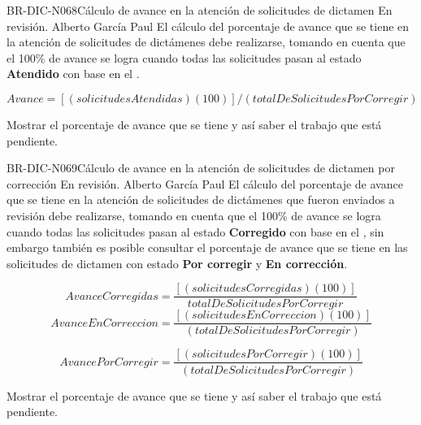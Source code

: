 \begin{BusinessRule}{BR-DIC-N068}{Cálculo de avance en la atención de solicitudes de dictamen}
	{\bcDerivation}    %
	{\btEnabler}     %
	{\blControlling}    %
	\BRItem[Estado] En revisión.
	 Alberto García Paul 
	\BRItem[Descripción] El cálculo del porcentaje de avance que se tiene en la atención de solicitudes de dictámenes debe realizarse, tomando en cuenta que el 100\% de avance se logra cuando todas las solicitudes pasan al estado \textbf{Atendido} con base en el .
	\BRItem[Sentencia]	\cdtEmpty
	
	$ Avance = [(solicitudesAtendidas)(100)]/(totalDeSolicitudesPorCorregir)$
	
	\BRItem[Motivacion] Mostrar el porcentaje de avance que se tiene y así saber el trabajo que está pendiente.
	
	
\end{BusinessRule}

\begin{BusinessRule}{BR-DIC-N069}{Cálculo de avance en la atención de solicitudes de dictamen por corrección}
	{\bcDerivation}    %
	{\btEnabler}     %
	{\blControlling}    %
	\BRItem[Estado] En revisión.
	 Alberto García Paul 
	\BRItem[Descripción] El cálculo del porcentaje de avance que se tiene en la atención de solicitudes de dictámenes que fueron enviados a revisión debe realizarse, tomando en cuenta que el 100\% de avance se logra cuando todas las solicitudes pasan al estado \textbf{Corregido} con base en el , sin embargo también es posible consultar el porcentaje de avance que se tiene en las solicitudes de dictamen con estado \textbf{Por corregir} y \textbf{En corrección}.
	\BRItem[Sentencia]	\cdtEmpty
	
	$$AvanceCorregidas = \frac{[(solicitudesCorregidas)(100)]}{totalDeSolicitudesPorCorregir}$$
	$$ AvanceEnCorreccion = \frac{[(solicitudesEnCorreccion
		)(100)]}{(totalDeSolicitudesPorCorregir)}$$
	
	$$AvancePorCorregir = \frac{[(solicitudesPorCorregir)(100)]}{(totalDeSolicitudesPorCorregir)}$$
	
	\BRItem[Motivacion] Mostrar el porcentaje de avance que se tiene y así saber el trabajo que está pendiente.
	
	
\end{BusinessRule}

